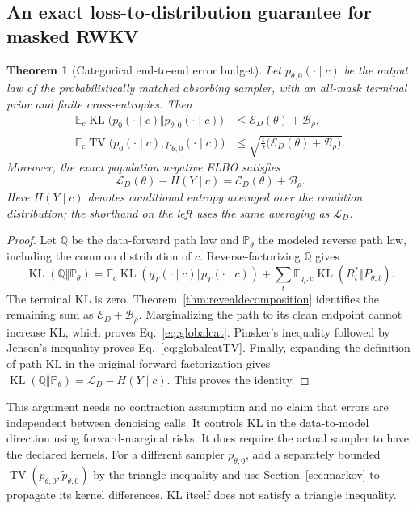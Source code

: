 \documentclass{article}
\newtheorem{theorem}{Theorem}[section]
\theoremstyle{remark}\newtheorem{remark}[theorem]{Remark}
\newcommand{\E}{\mathbb E}
\newcommand{\TV}{\operatorname{TV}}
\newcommand{\KL}{\operatorname{KL}}
\begin{document}
\subsection{An exact loss-to-distribution guarantee for masked RWKV}
\begin{theorem}[Categorical end-to-end error budget]
\label{thm:categoricalglobal}
Let $p_{\theta,0}(\cdot\mid c)$ be the output law of the probabilistically matched absorbing sampler, with an all-mask terminal prior and finite cross-entropies. Then
\begin{align}
 \E_c\KL\bigl(p_0(\cdot\mid c)\Vert p_{\theta,0}(\cdot\mid c)\bigr)
 &\le \mathcal E_D(\theta)+\mathcal B_\rho,\label{eq:globalcat}\\
 \E_c\TV\bigl(p_0(\cdot\mid c),p_{\theta,0}(\cdot\mid c)\bigr)
 &\le\sqrt{\tfrac12\bigl(\mathcal E_D(\theta)+\mathcal B_\rho\bigr)}.
 \label{eq:globalcatTV}
\end{align}
Moreover, the exact population negative ELBO satisfies
\begin{equation}
 \boxed{\mathcal L_D(\theta)-H(Y\mid c)
 =\mathcal E_D(\theta)+\mathcal B_\rho.}
 \label{eq:exactriskidentity}
\end{equation}
Here $H(Y\mid c)$ denotes conditional entropy averaged over the condition distribution; the shorthand on the left uses the same averaging as $\mathcal L_D$.
\end{theorem}
\begin{proof}
Let $\mathbb Q$ be the data-forward path law and $\mathbb P_\theta$ the modeled reverse path law, including the common distribution of $c$. Reverse-factorizing $\mathbb Q$ gives
\begin{equation}
 \KL(\mathbb Q\Vert\mathbb P_\theta)
 =\E_c\KL(q_T(\cdot\mid c)\Vert p_T(\cdot\mid c))
 +\sum_t\E_{q_t,c}\KL(R_t^*\Vert P_{\theta,t}).
 \label{eq:pathKL}
\end{equation}
The terminal KL is zero. Theorem~\ref{thm:revealdecomposition} identifies the remaining sum as $\mathcal E_D+\mathcal B_\rho$. Marginalizing the path to its clean endpoint cannot increase KL, which proves Eq.~\eqref{eq:globalcat}. Pinsker's inequality followed by Jensen's inequality proves Eq.~\eqref{eq:globalcatTV}. Finally, expanding the definition of path KL in the original forward factorization gives
$\KL(\mathbb Q\Vert\mathbb P_\theta)=\mathcal L_D-H(Y\mid c)$.
This proves the identity.
\end{proof}

This argument needs no contraction assumption and no claim that errors are independent between denoising calls. It controls KL in the data-to-model direction using forward-marginal risks. It does require the actual sampler to have the declared kernels. For a different sampler $\widetilde p_{\theta,0}$, add a separately bounded
$\TV(p_{\theta,0},\widetilde p_{\theta,0})$ by the triangle inequality and use Section~\ref{sec:markov} to propagate its kernel differences. KL itself does not satisfy a triangle inequality.
\end{document}
